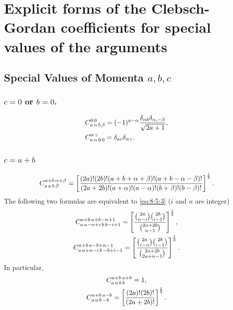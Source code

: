 \section[Special Values of the arguments]{Explicit forms of the Clebsch-Gordan coefficients for special values of the arguments}\label{sec:8.5}
\subsection{Special Values of Momenta $a, b, c$}\label{sec:8.5.1}
\subsubsection{$c=0$ or $b=0$.}
\begin{align}
& C_{a\,\alpha\,b\,\beta}^{0\,0}=(-1)^{a-\alpha} \frac{\delta_{\alpha b} \delta_{\alpha,-\beta}}{\sqrt{2 a+1}}, \label{eq:8:5:1}\\
& C_{a\,\alpha\,0\,0}^{\alpha\,\gamma}=\delta_{a c} \delta_{\alpha \gamma}. \label{eq:8:5:2}
\end{align}
\subsubsection{$c=a+b$} 
\begin{equation}
C_{a\,a\,b\,\beta}^{a+b\,\alpha+\beta}=\left[\frac{(2 a)!(2 b)!(a+b+\alpha+\beta)!(a+b-\alpha-\beta)!}{(2 a+2 b)!(a+\alpha)!(a-\alpha)!(b+\beta)!(b-\beta)!}\right]^{\frac{1}{2}}. \label{eq:8:5:3}
\end{equation}
The following two formulas are equivalent to \eqref{eq:8:5:3} ($i$ and $n$ are integer)
\begin{gather}
C_{a\,a-n+i\,b\,b-i+1}^{a+b\,a+b-n+1}=\left[\frac{\binom{2 a}{n-i}\binom{2 b}{i-1}}{\binom{2 a+2 b}{n-1}}\right]^{\frac{1}{2}}, \label{eq:8:5:4}\\
C_{a\,a+n-i\,b\,-b+i-1}^{a+b\,a-b+n-1}=\left[\frac{\binom{2 a}{i-n}\binom{2 b}{i-1}}{\binom{2 a+2 b}{2 a+n-1}}\right]^{\frac{1}{2}}. \label{eq:8:5:5}
\end{gather}
In particular,
\begin{gather}
C_{a\,a\,b\,b}^{a+b\,a+b}=1, \label{eq:8:5:6}\\
C_{a\,a\,b\,-b}^{a+b\,a-b}=\left[\frac{(2 a)!(2 b)!}{(2 a+2 b)!}\right]^{\frac{1}{2}}. \label{eq:8:5:7}
\end{gather}
